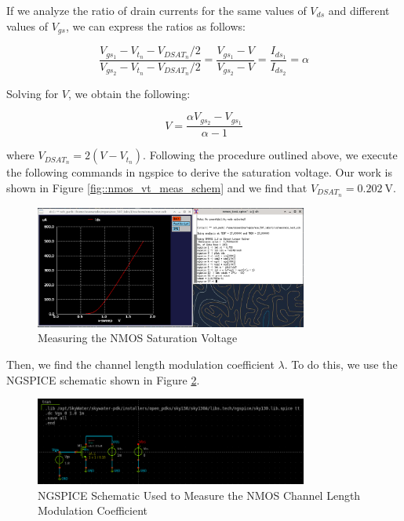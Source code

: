 \documentclass[fleqn]{article}
\begin{document}
	\noindent If we analyze the ratio of drain currents for the same values of $V_{ds}$ and different values of $V_{gs}$, we can express the ratios as follows:
	
	\begin{equation}
		\frac{V_{gs_1} - V_{t_n} - V_{DSAT_n}/2}{V_{gs_2} - V_{t_n} - V_{DSAT_n}/2} = \frac{V_{gs_1} - V}{V_{gs_2} - V} = \frac{I_{ds_1}}{I_{ds_2}} = \alpha
	\end{equation}
	
	\noindent Solving for $V$, we obtain the following:
	
	\begin{equation}
		V = \frac{{\alpha}V_{gs_2} - V_{gs_1}}{\alpha - 1}
	\end{equation}
	
	\noindent where $V_{DSAT_n} = 2(V - V_{t_n})$. Following the procedure outlined above, we execute the following commands in ngspice to derive the saturation voltage. Our work is shown in Figure \ref{fig::nmos_vt_meas_schem} and we find that $V_{DSAT_n} = 0.202\ \text{V}$.
	
	\begin{figure}[H]
		\centerline{\includegraphics[width=0.8\textwidth]{nmos_vdsat_meas.png}}
		\caption{Measuring the NMOS Saturation Voltage}
		\label{fig::nmos_vdsat_meas}
	\end{figure}
	
	Then, we find the channel length modulation coefficient $\lambda$. To do this, we use the NGSPICE schematic shown in Figure \ref{fig::nmos_lambda_meas_schem}.
	
	\begin{figure}[H]
		\centerline{\includegraphics[width=0.8\textwidth]{nmos_vt_meas_schem.png}}
		\caption{NGSPICE Schematic Used to Measure the NMOS Channel Length Modulation Coefficient}
		\label{fig::nmos_lambda_meas_schem}
	\end{figure}
	
\end{document}
